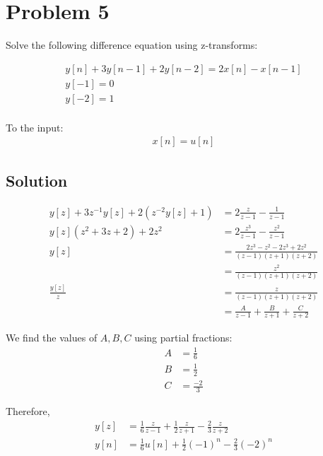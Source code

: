 \section*{Problem 5}

Solve the following difference equation using z-transforms:

\begin{equation*}
\begin{aligned}
y[n] + 3y[n-1] + 2y[n-2] = 2x[n] - x[n-1]\\
y[-1] = 0\\
y[-2] = 1\\
\end{aligned}
\end{equation*} 

To the input:
\begin{equation*}
\begin{aligned}
x[n]=u[n]
\end{aligned}
\end{equation*} 

\subsection*{Solution}

\begin{equation*}
\begin{aligned}
y[z] + 3z^{-1}y[z] + 2(z^{-2}y[z]+1) &= 2\frac{z}{z-1} - \frac{1}{z-1}\\
y[z](z^2+3z+2) + 2z^2 &= 2 \frac{z^3}{z-1} - \frac{z^2}{z-1}\\
y[z] &= \frac{2z^3-z^2-2z^3+2z^2}{(z-1)(z+1)(z+2)} \\
&= \frac{z^2}{(z-1)(z+1)(z+2)} \\
\frac{y[z]}{z} &= \frac{z}{(z-1)(z+1)(z+2)} \\
&= \frac{A}{z-1} + \frac{B}{z+1} + \frac{C}{z+2}
\end{aligned}
\end{equation*} 

We find the values of $A,B,C$ using partial fractions:
\begin{equation*}
\begin{aligned}
A &= \frac{1}{6} \\
B &= \frac{1}{2} \\
C &= \frac{-2}{3}
\end{aligned}
\end{equation*} 

Therefore,
\begin{equation*}
\begin{aligned}
y[z] &= \frac{1}{6} \frac{z}{z-1} + \frac{1}{2} \frac{z}{z+1} - \frac{2}{3} \frac{z}{z+2} \\
y[n] &= \frac{1}{6} u[n] + \frac{1}{2} (-1)^n - \frac{2}{3} (-2)^n
\end{aligned}
\end{equation*} 

